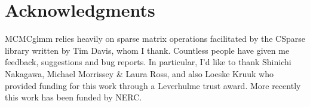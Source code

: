 \documentclass[oneside]{book}
\begin{document}
 










\chapter*{Acknowledgments}

MCMCglmm relies heavily on sparse matrix operations facilitated by the CSparse library written by Tim Davis, whom I thank. Countless people have given me feedback, suggestions and bug reports. In particular, I'd like to thank Shinichi Nakagawa, Michael Morrissey \& Laura Ross, and also Loeske Kruuk who provided funding for this work through a Leverhulme trust award. More recently this work has been funded by NERC. 





\printindex
\end{document}
